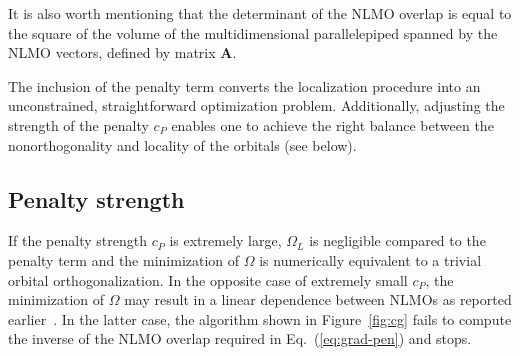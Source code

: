 \documentclass[aps,prl,reprint,amsmath,amssymb]{revtex4-1}
\newcommand{\braket}[2]{\ensuremath{\langle #1 \vert #2 \rangle}} %
\begin{document}

It is also worth mentioning that the determinant of the NLMO overlap is equal to the square of the volume of the multidimensional parallelepiped spanned by the NLMO vectors, defined by matrix $\mathbf{A}$. 

The inclusion of the penalty term converts the localization procedure into an unconstrained, straightforward optimization problem. Additionally, adjusting the strength of the penalty $c_P$ enables one to achieve the right balance between the nonorthogonality and locality of the orbitals (see below). 

\subsection{Penalty strength}

If the penalty strength $c_P$ is extremely large, $\Omega_L$ is negligible compared to the penalty term and the minimization of $\Omega$ is numerically equivalent to a trivial orbital orthogonalization. In the opposite case of extremely small $c_P$, the minimization of $\Omega$ may result in a linear dependence between NLMOs as reported earlier~\cite{cui2010efficient}. 
In the latter case, the algorithm shown in Figure~\ref{fig:cg} fails to compute the inverse of the NLMO overlap required in Eq.~(\ref{eq:grad-pen}) and stops. 
\end{document}
